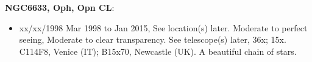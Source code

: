 {\bf NGC6633, Oph, Opn CL}:
\begin{itemize}
\item xx/xx/1998 Mar 1998 to Jan 2015, See location(s) later. Moderate to perfect seeing, Moderate to clear transparency. See telescope(s) later, 36x; 15x. C114F8, Venice (IT); B15x70, Newcastle (UK). A beautiful chain of stars.
\end{itemize}
